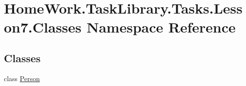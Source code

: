 \hypertarget{namespace_home_work_1_1_task_library_1_1_tasks_1_1_lesson7_1_1_classes}{}\section{Home\+Work.\+Task\+Library.\+Tasks.\+Lesson7.\+Classes Namespace Reference}
\label{namespace_home_work_1_1_task_library_1_1_tasks_1_1_lesson7_1_1_classes}
\subsection*{Classes}
\begin{DoxyCompactItemize}
\item 
class \mbox{\hyperlink{class_home_work_1_1_task_library_1_1_tasks_1_1_lesson7_1_1_classes_1_1_person}{Person}}
\end{DoxyCompactItemize}
